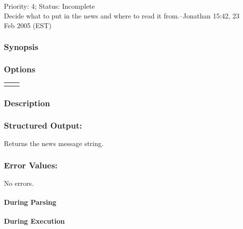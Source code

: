 \subsection{}
\label{soarnews}
 Priority: 4; Status: Incomplete\\ 
Decide what to put in the news and where to read it from.--Jonathan 15:42, 23 Feb 2005 (EST) 
\subsubsection*{Synopsis}
\subsubsection*{Options}
\begin{tabular}{|l|l|}
\hline 
 & \\
 \hline 
 & \\
 \hline 
\end{tabular}
\subsubsection*{Description}
\subsubsection*{Structured Output:}
 Returns the news message string. 
\subsubsection*{Error Values:}
 No errors. 
\paragraph*{During Parsing}
\paragraph*{During Execution}
